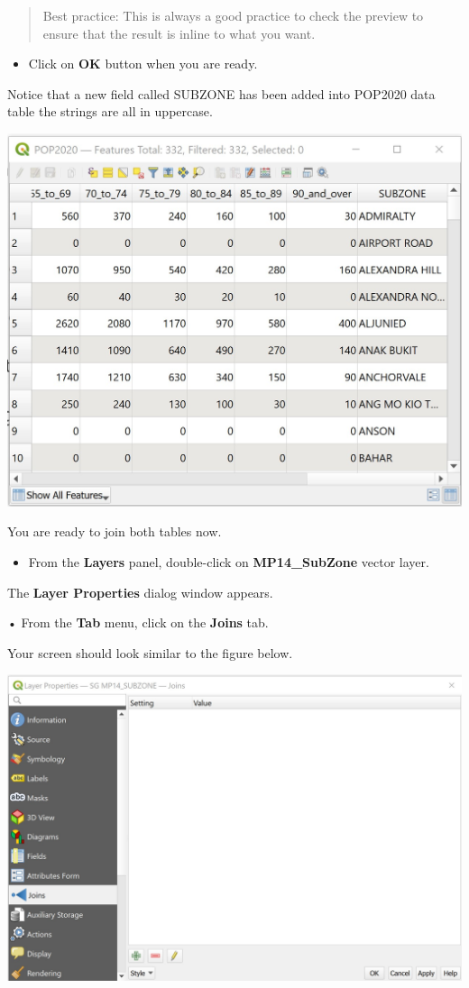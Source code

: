 \documentclass[
  letterpaper,
  DIV=11,
  numbers=noendperiod]{scrreprt}
\providecommand{\tightlist}{%
  \setlength{\itemsep}{0pt}\setlength{\parskip}{0pt}}\usepackage{longtable,booktabs,array}
\begin{document}
\begin{quote}
Best practice: This is always a good practice to check the preview to
ensure that the result is inline to what you want.
\end{quote}

\begin{itemize}
\tightlist
\item
  Click on \textbf{OK} button when you are ready.
\end{itemize}

Notice that a new field called SUBZONE has been added into POP2020 data
table the strings are all in uppercase.

\includegraphics{./img03/image25.jpg}

You are ready to join both tables now.

\begin{itemize}
\tightlist
\item
  From the \textbf{Layers} panel, double-click on \textbf{MP14\_SubZone}
  vector layer.
\end{itemize}

The \textbf{Layer Properties} dialog window appears.

• From the \textbf{Tab} menu, click on the \textbf{Joins} tab.

Your screen should look similar to the figure below.

\includegraphics{./img03/image26.jpg}
\end{document}
